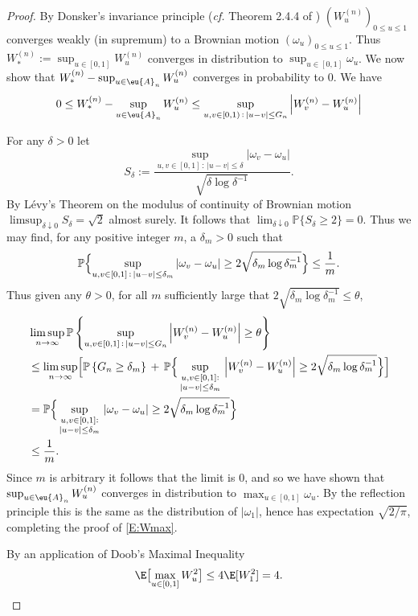 \documentclass[11pt]{amsart}
\renewcommand{\P}{\mathbb{P}}
\begin{document}
\begin{proof}
	By Donsker's invariance principle ({\em cf.} Theorem 2.4.4 of \cite{EKM97})
	$(W^{(n)}_{u})_{0\le u\le 1}$ converges weakly (in supremum) to a Brownian motion 
	$(\omega_{u})_{0\le u\le 1}$. Thus $W_*^{(n)}:= \sup_{u\in [0,1]} W_u^{(n)}$ converges
	in distribution to $\sup_{u\in [0,1]} \omega_u$. We now show that 
	$W_*^{(n)} - \sup_{u\in \eu{A}_n} W_u^{(n)}$ converges in probability to 0.
	We have
	$$
		0\le W_*^{(n)} - \sup_{u\in \eu{A}_n} W_u^{(n)} \le \sup_{u,v\in [0,1)\, : \, |u-v|\le G_n} \left| W_v^{(n)} - W_u^{(n)} \right|
	$$
	
For any $\delta>0$ let
$$
	S_\delta:= \frac{\sup_{u,v\in [0,1]\, : \, |u-v|\le \delta} |\omega_v - \omega_u|}{\sqrt{\delta\log \delta^{-1}}}.
$$
By L\'evy's Theorem on the modulus of continuity of Brownian motion \cite[Theorem 9.25]{KS14}
$\limsup_{\delta \downarrow 0} S_\delta =\sqrt{2}$ almost surely. 
It follows that ${\lim_{\delta\downarrow 0} \P\{S_\delta \ge 2 \} =0}$. 
Thus we may find, for any positive integer $m$, a $\delta_m>0$ such that
\begin{align*}
	\P \Bigl\{  \sup_{u,v\in [0,1]\, : \, |u-v|\le \delta_m} |\omega_v - \omega_u| \ge 2\sqrt{\delta_m\log \delta_m^{-1}} \Bigr\} \le \frac1m .
\end{align*}
Thus given any $\theta >0$, for all $m$ sufficiently large that
$2\sqrt{\delta_m \log \delta_m^{-1}}\le \theta$,
\begin{align*}
	&\limsup_{n\to\infty} \P\left\{ \sup_{u,v\in [0,1]\, : \, |u-v|\le G_n} \left| W_v^{(n)} - W_u^{(n)} \right| \ge \theta \right\}\\
	&\le \limsup_{n\to\infty} \Bigl[ \P\left\{ G_n \ge \delta_m \right\} \, + \,
	\P\Bigl\{ \sup_{\begin{smallmatrix}
			u,v\in [0,1]: \\|u-v|\le \delta_m
	\end{smallmatrix}} \left| W_v^{(n)} - W_u^{(n)} \right| \ge 2 \sqrt{\delta_m \log \delta_m^{-1}} \Bigr\} \Bigr]\\
	&=\P\Bigl\{ \sup_{\begin{smallmatrix}
			u,v\in [0,1]: \\|u-v|\le \delta_m
		\end{smallmatrix}} \left| \omega_v - \omega_u \right| \ge 2 \sqrt{\delta_m \log \delta_m^{-1}} \Bigr\}\\
	&\le \frac{1}{m} .
\end{align*}
Since $m$ is arbitrary it follows that the limit is 0, and so we have shown that $\sup_{u\in \eu{A}_n} W_u^{(n)}$ converges in distribution to $\max_{u\in [0,1]} \omega_u$. By the reflection
principle this is the same as the distribution of $|\omega_1|$, hence has expectation
$\sqrt{2/\pi}$, completing the proof of \eqref{E:Wmax}.

By an application of Doob's Maximal Inequality \cite[Theorem 5.4.3]{rD10}
$$
	\E\bigl[ \max_{u\in [0,1]} W_u^2 \bigr] \le 4  \E [ W_1^2]=4.
$$

\end{proof}
\end{document}
